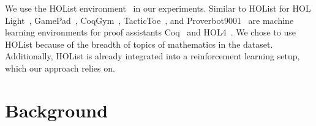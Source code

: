 \documentclass{article}
\begin{document}
We use the HOList environment~\citep{bansal2019holist} in our experiments. 
Similar to HOList for HOL Light~\citep{Harrison96}, GamePad~\citep{huang2018gamepad}, CoqGym~\citep{yang2019learning}, TacticToe~\citep{gauthier2017tactictoe}, and Proverbot9001~\citep{proverbot2019} are machine learning environments for proof assistants Coq~\citep{coq} and HOL4~\citep{slind2008brief}.
We chose to use HOList because of the breadth of topics of mathematics in the dataset.
Additionally, HOList is already integrated into a reinforcement learning setup, which our approach relies on.






\section{Background}
\label{sec:background}
\end{document}
